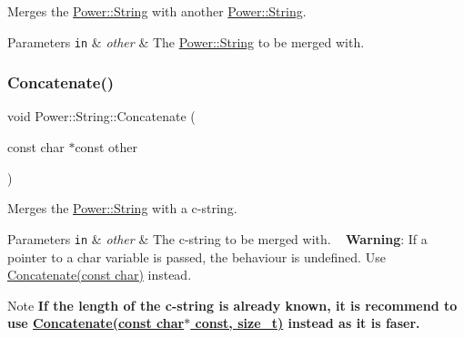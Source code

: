 Merges the \hyperlink{class_power_1_1_string}{Power\+::\+String} with another \hyperlink{class_power_1_1_string}{Power\+::\+String}. 


\begin{DoxyParams}[1]{Parameters}
\mbox{\tt in}  & {\em other} & The \hyperlink{class_power_1_1_string}{Power\+::\+String} to be merged with. \\
\hline
\end{DoxyParams}
\mbox{\label{class_power_1_1_string_aa8d8f7ef094a1057e5ab46742b42ad13}} 
\subsubsection{\texorpdfstring{Concatenate()}{Concatenate()}\hspace{0.1cm}{\footnotesize\ttfamily [2/4]}}
{\footnotesize\ttfamily void Power\+::\+String\+::\+Concatenate (\begin{DoxyParamCaption}\item[{const char $\ast$const}]{other }\end{DoxyParamCaption})\hspace{0.3cm}{\ttfamily [inline]}}



Merges the \hyperlink{class_power_1_1_string}{Power\+::\+String} with a c-\/string. 


\begin{DoxyParams}[1]{Parameters}
\mbox{\tt in}  & {\em other} & The c-\/string to be merged with. ~\newline
 {\bfseries Warning}\+: If a pointer to a char variable is passed, the behaviour is undefined. Use \hyperlink{class_power_1_1_string_ad5714c502a8ca25a8d3afbbf84590c63}{Concatenate(const char)} instead. \\
\hline
\end{DoxyParams}
\begin{DoxyNote}{Note}
{\bfseries If the length of the c-\/string is already known, it is recommend to use \hyperlink{class_power_1_1_string_aa21774f7245c99303be83b452735fe00}{Concatenate(const char$\ast$ const, size\+\_\+t)} instead as it is faser.} 
\end{DoxyNote}
\mbox{\label{class_power_1_1_string_aa21774f7245c99303be83b452735fe00}} 
